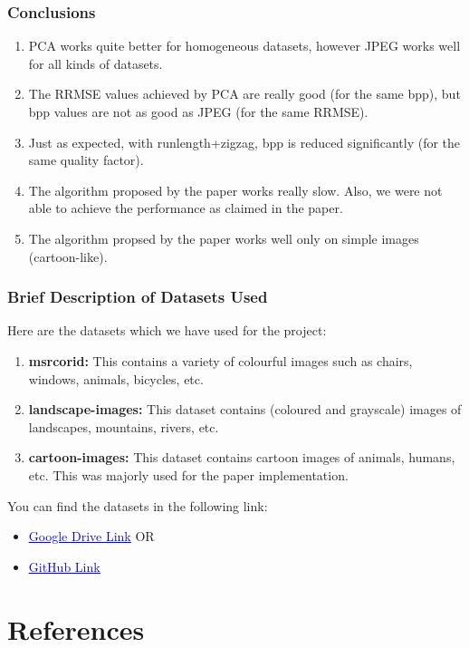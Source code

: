 \documentclass[Serif, 10pt, brown]{beamer}
\theoremstyle{example}
\theoremstyle{plain}
\begin{document}
\begin{frame}
	\frametitle{Conclusions}
	\begin{enumerate}
		\item PCA works quite better for homogeneous datasets, however JPEG works well for all kinds of datasets.
		\item The RRMSE values achieved by PCA are really good (for the same bpp), but bpp values are not as good as JPEG (for the same RRMSE).
		\item Just as expected, with runlength+zigzag, bpp is reduced significantly (for the same quality factor).
		\item The algorithm proposed by the paper works really slow. Also, we were not able to achieve the performance as claimed in the paper.
		\item The algorithm propsed by the paper works well only on simple images (cartoon-like).
	\end{enumerate}
\end{frame}

\begin{frame}
	\frametitle{Brief Description of Datasets Used}
	Here are the datasets which we have used for the project:
	\begin{enumerate}
		\item {\bf msrcorid:} This contains a variety of colourful images such as chairs, windows, animals, bicycles, etc.
		\item {\bf landscape-images:} This dataset contains (coloured and grayscale) images of landscapes, mountains, rivers, etc.
		\item {\bf cartoon-images:} This dataset contains cartoon images of animals, humans, etc. This was majorly used for the paper implementation.
	\end{enumerate}
	You can find the datasets in the following link:
	\begin{itemize}
		\item \href{https://drive.google.com/drive/folders/14ArHoenKSdaGJ7WB250A8ZkXXRmb84wY?usp=sharing}{\textcolor{blue}{\underline{Google Drive Link}}} OR
		\item \href{https://github.com/sakshamrathi21/Image-Compression-Project/tree/main/images}{\textcolor{blue}{\underline{GitHub Link}}}
	\end{itemize}
\end{frame}

\section{References}
\end{document}
